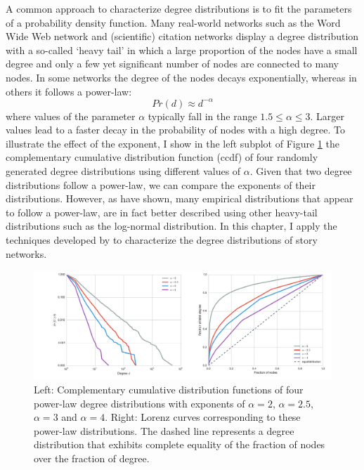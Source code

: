 A common approach to characterize degree distributions is to fit the parameters of a probability density function. Many real-world networks such as the Word Wide Web network and (scientific) citation networks display a degree distribution with a so-called `heavy tail' in which a large proportion of the nodes have a small degree and only a few yet significant number of nodes are connected to many nodes\autocite{newman:2003}. In some networks the degree of the nodes decays exponentially, whereas in others it follows a power-law:
\begin{equation}\label{eq:powerlaw}
Pr(d) \approx d^{-\alpha}
\end{equation}
where values of the parameter $\alpha$ typically fall in the range $1.5 \leq \alpha \leq 3$\autocite[table II]{newman:2003}. Larger values lead to a faster decay in the probability of nodes with a high degree. To illustrate the effect of the exponent, I show in the left subplot of Figure \ref{fig:lorenz-examples} the complementary cumulative distribution function (ccdf) of four randomly generated degree distributions using different values of $\alpha$. Given that two degree distributions follow a power-law, we can compare the exponents of their distributions. However, as \citeauthor{clauset:2009} have shown, many empirical distributions that appear to follow a power-law, are in fact better described using other heavy-tail distributions such as the log-normal distribution\autocite{clauset:2009}. In this chapter, I apply the techniques developed by \citeauthor{clauset:2009} to characterize the degree distributions of story networks\autocite{clauset:2009}.

\begin{figure}
\centering
\includegraphics[width=\textwidth]{images/lorenz_examples.pdf}
\caption{Left: Complementary cumulative distribution functions of four power-law degree distributions with exponents of $\alpha=2$, $\alpha=2.5$, $\alpha=3$ and $\alpha=4$. Right: Lorenz curves corresponding to these power-law distributions. The dashed line represents a degree distribution that exhibits complete equality of the fraction of nodes over the fraction of degree.}
\label{fig:lorenz-examples}
\end{figure}

